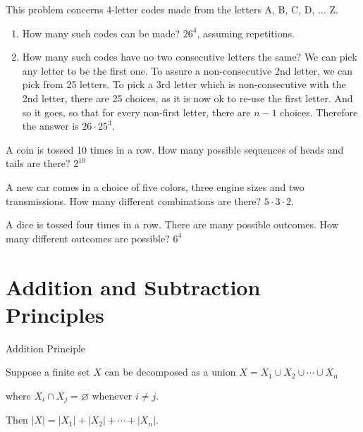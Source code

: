\documentclass[openany, 12pt]{book}
\begin{document}
\begin{exercise}{}{}
	This problem concerns 4-letter codes made from the letters A, B, C, D,
	$\ldots$ Z.
	\begin{enumerate}[label = {(\arabic*)}]
		\item How many such codes can be made?
		      $26^4$, assuming repetitions.
		\item How many such codes have no two consecutive letters the same?
		      We can pick any letter to be the first one. To assure a non-consecutive
		      2nd letter, we can pick from 25 letters.  To pick a 3rd letter which is
		      non-consecutive with the 2nd letter, there are 25 choices, as it is now ok
		      to re-use the first letter. And so it goes, so that for every non-first
		      letter, there are $n-1$ choices.
		      Therefore the answer is $26\cdot 25^3$.
	\end{enumerate}
\end{exercise}

\begin{exercise}{}{}
	A coin is tossed 10 times in a row. How many possible
	sequences of heads and tails are there?
	$2^{10}$
\end{exercise}

\begin{exercise}{}{} A new car comes in a choice of five colors, three engine
	sizes and two transmissions. How many different combinations are there?
	$5 \cdot 3 \cdot 2$.
\end{exercise}

\begin{exercise}{}{}
	A dice is tossed four times in a row. There are many
	possible outcomes. How many different outcomes are possible?
	$6^4$
\end{exercise}

\section{Addition and Subtraction Principles}
\begin{definition}{Addition Principle}{}
	\begin{blist}
		\item Suppose a finite set $X$ can be decomposed as a union $X=X_1 \cup
			X_2 \cup \cdots \cup X_n$
		\item where $X_i \cap X_j=\varnothing$ whenever $i \neq j$.
		\item Then $|X|=\left|X_1\right|+\left|X_2\right|+\cdots+\left|X_n\right|$.
	\end{blist}
\end{definition}
\end{document}
